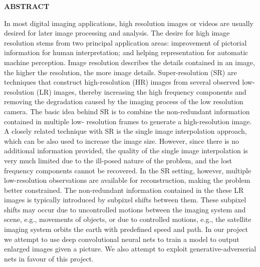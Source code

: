 \centerline{\large{\bfseries{ABSTRACT}}}

\hspace{1in}

\normalsize

In most digital imaging applications, high resolution images or videos are usually desired for later image processing and analysis. The desire for high image resolution stems from two principal application areas: improvement of pictorial information for human interpretation; and helping representation for automatic machine perception. Image resolution describes the details contained in an image, the higher the resolution, the more image details.
Super-resolution (SR) are techniques that construct high-resolution (HR) images from several observed low-resolution (LR) images, thereby increasing the high frequency components and removing the degradation caused by the imaging process of the low resolution camera. The basic idea behind SR is to combine the non-redundant information contained in multiple low- resolution frames to generate a high-resolution image. A closely related technique with SR is the single image interpolation approach, which can be also used to increase the image size. However, since there is no additional information provided, the quality of the single image interpolation is very much limited due to the ill-posed nature of the problem, and the lost frequency components cannot be recovered. In the SR setting, however, multiple low-resolution observations
are available for reconstruction, making the problem better constrained. The non-redundant information contained in the these LR images is typically introduced by subpixel shifts between them. These subpixel shifts may occur due to uncontrolled motions between the imaging system and scene, e.g., movements of objects, or due to controlled motions, e.g., the satellite imaging system orbits the earth with predefined speed and path.
In our project we attempt to use deep convolutional neural nets to train a model to output enlarged images given a picture. We also attempt to exploit generative-adverserial nets in favour of this project.